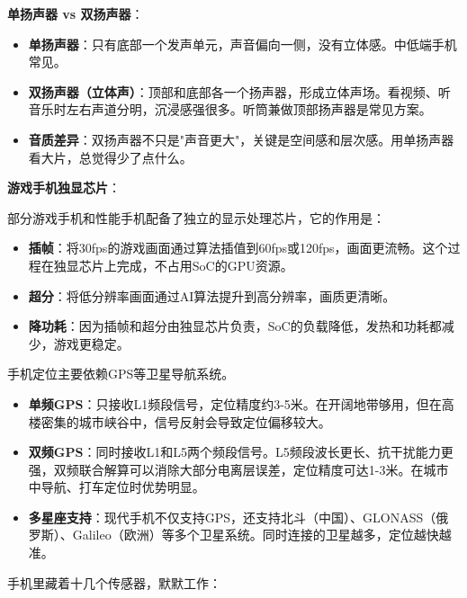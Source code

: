 \textbf{单扬声器 vs 双扬声器}：

\begin{itemize}
  \item \textbf{单扬声器}：只有底部一个发声单元，声音偏向一侧，没有立体感。中低端手机常见。
  \item \textbf{双扬声器（立体声）}：顶部和底部各一个扬声器，形成立体声场。看视频、听音乐时左右声道分明，沉浸感强很多。听筒兼做顶部扬声器是常见方案。
  \item \textbf{音质差异}：双扬声器不只是"声音更大"，关键是空间感和层次感。用单扬声器看大片，总觉得少了点什么。
\end{itemize}

\textbf{游戏手机独显芯片}：

部分游戏手机和性能手机配备了独立的显示处理芯片，它的作用是：

\begin{itemize}
  \item \textbf{插帧}：将30fps的游戏画面通过算法插值到60fps或120fps，画面更流畅。这个过程在独显芯片上完成，不占用SoC的GPU资源。
  \item \textbf{超分}：将低分辨率画面通过AI算法提升到高分辨率，画质更清晰。
  \item \textbf{降功耗}：因为插帧和超分由独显芯片负责，SoC的负载降低，发热和功耗都减少，游戏更稳定。
\end{itemize}


手机定位主要依赖GPS等卫星导航系统。

\begin{itemize}
  \item \textbf{单频GPS}：只接收L1频段信号，定位精度约3-5米。在开阔地带够用，但在高楼密集的城市峡谷中，信号反射会导致定位偏移较大。
  \item \textbf{双频GPS}：同时接收L1和L5两个频段信号。L5频段波长更长、抗干扰能力更强，双频联合解算可以消除大部分电离层误差，定位精度可达1-3米。在城市中导航、打车定位时优势明显。
  \item \textbf{多星座支持}：现代手机不仅支持GPS，还支持北斗（中国）、GLONASS（俄罗斯）、Galileo（欧洲）等多个卫星系统。同时连接的卫星越多，定位越快越准。
\end{itemize}


手机里藏着十几个传感器，默默工作：

